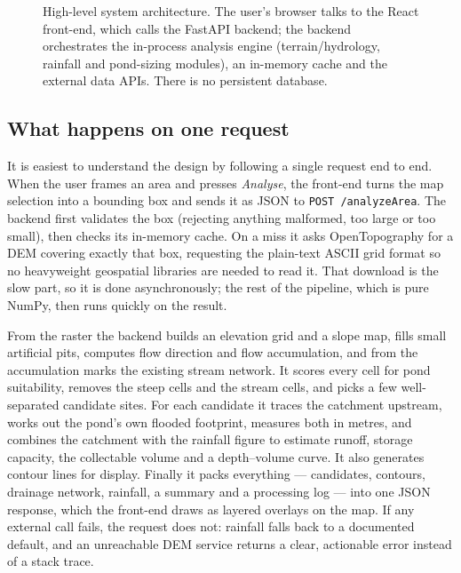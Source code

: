 \documentclass[manuscript,screen]{acmart}
\begin{document}
\begin{figure}[h]
{}
  \caption{High-level system architecture. The user's browser talks to the React
  front-end, which calls the FastAPI backend; the backend orchestrates the
  in-process analysis engine (terrain/hydrology, rainfall and pond-sizing modules),
  an in-memory cache and the external data APIs. There is no persistent database.}
  \label{fig:architecture}
\end{figure}

\subsection{What happens on one request}
It is easiest to understand the design by following a single request end to end.
When the user frames an area and presses \emph{Analyse}, the front-end turns the
map selection into a bounding box and sends it as JSON to \texttt{POST
/analyzeArea}. The backend first validates the box (rejecting anything malformed,
too large or too small), then checks its in-memory cache. On a miss it asks
OpenTopography for a DEM covering exactly that box, requesting the plain-text ASCII
grid format so no heavyweight geospatial libraries are needed to read it. That
download is the slow part, so it is done asynchronously; the rest of the pipeline,
which is pure NumPy, then runs quickly on the result.

From the raster the backend builds an elevation grid and a slope map, fills small
artificial pits, computes flow direction and flow accumulation, and from the
accumulation marks the existing stream network. It scores every cell for pond
suitability, removes the steep cells and the stream cells, and picks a few
well-separated candidate sites. For each candidate it traces the catchment
upstream, works out the pond's own flooded footprint, measures both in metres, and
combines the catchment with the rainfall figure to estimate runoff, storage
capacity, the collectable volume and a depth--volume curve. It also generates
contour lines for display. Finally it packs everything --- candidates, contours,
drainage network, rainfall, a summary and a processing log --- into one JSON
response, which the front-end draws as layered overlays on the map. If any external
call fails, the request does not: rainfall falls back to a documented default, and
an unreachable DEM service returns a clear, actionable error instead of a stack
trace.
\end{document}
